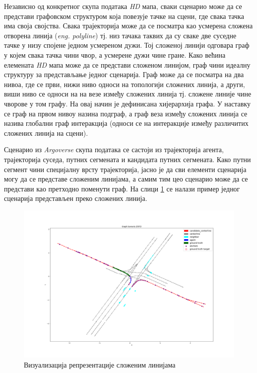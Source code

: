 \documentclass[11pt,oneside]{memoir}
\begin{document}
Независно од конкретног скупа података \textit{HD} мапа, сваки сценарио може да се представи графовском структуром која повезује тачке на сцени, где
свака тачка има своја својства. Свака трајекторија може да се посматра као усмерена сложена отворена линија (\textit{eng. polyline}) тј.
низ тачака таквих да су сваке две суседне тачке у низу спојене једном усмереном дужи. Тој сложеној линији одговара граф у којем свака тачка
чини чвор, а усмерене дужи чине гране. Како већина елемената \textit{HD} мапа може да се представи сложеном линијом, граф чини идеалну структуру
за представљање једног сценарија. Граф може да се посматра на два нивоа, где се први, нижи ниво односи на топологији сложених линија, а други, виши ниво 
се односи на на везе између сложених линија тј. сложене линије чине чворове у том графу. На овај начин је дефинисана хијерархија графа. 
У наставку се граф на првом нивоу назина подграф, а граф веза између сложених линија се назива глобални граф интеракција (односи се на интеракције
између различитих сложених линија на сцени).

Сценарио из \textit{Argoverse} скупа података се састоји из трајекторија агента, трајекторија суседа, путних сегмената и кандидата путних сегмената.
Како путни сегмент чини специјалну врсту трајекторија, јасно је да сви елементи сценарија могу да се представе сложеним линијама, а самим тим
цео сценарио може да се представи као претходно поменути граф. На слици \ref{polylines-representation} се налази пример једног сценарија
представљен преко сложених линија.

\begin{figure}[H]
  \includegraphics[width=1.0\textwidth]{images/polylines-representation.png}
  \caption{Визуализација репрезентације сложеним линијама}
  \label{polylines-representation}
\end{figure}
\end{document}
